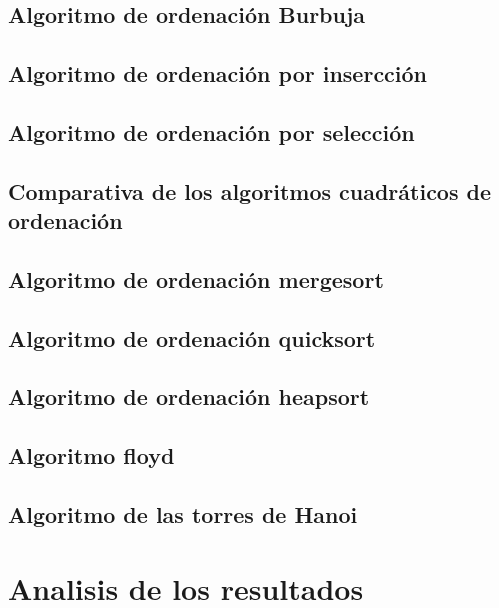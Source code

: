 \documentclass{article}
\begin{document}
\subsection{Algoritmo de ordenación Burbuja}


\subsection{Algoritmo de ordenación por insercción}




\subsection{Algoritmo de ordenación por selección}



\subsection{Comparativa de los algoritmos cuadráticos de ordenación}

\subsection{Algoritmo de ordenación mergesort}

\subsection{Algoritmo de ordenación quicksort}

\subsection{Algoritmo de ordenación heapsort}

\subsection{Algoritmo floyd}

\subsection{Algoritmo de las torres de Hanoi}


\section{Analisis de los resultados}
\end{document}

